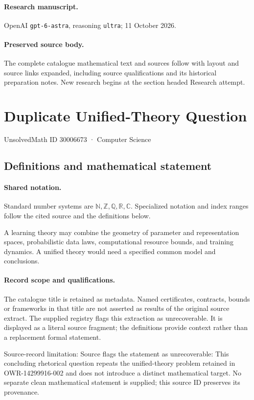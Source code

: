 \documentclass[11pt]{article}
\begin{document}
\paragraph{Research manuscript.} OpenAI \texttt{gpt-6-astra}, reasoning \texttt{ultra}; 11 October 2026.
\paragraph{Preserved source body.} The complete catalogue mathematical text and sources follow with layout and source links expanded, including source qualifications and its historical preparation notes. New research begins at the section headed Research attempt.

\section{Duplicate Unified-Theory Question}\label{30006673}
{\small UnsolvedMath ID 30006673 · Computer Science}
\subsection{Definitions and mathematical statement}

\paragraph{Shared notation.}Standard number systems are $\mathbb N,\mathbb Z,\mathbb Q,\mathbb R,\mathbb C$. Specialized notation and index ranges follow the cited source and the definitions below.


A learning theory may combine the geometry of parameter and representation spaces, probabilistic data laws, computational resource bounds, and training dynamics. A unified theory would need a specified common model and conclusions.
\paragraph{Record scope and qualifications.}
The catalogue title is retained as metadata. Named certificates, contracts, bounds or frameworks in that title are not asserted as results of the original source extract.
The supplied registry flags this extraction as unrecoverable. It is displayed as a literal source fragment; the definitions provide context rather than a replacement formal statement.

Source-record limitation: Source flags the statement as unrecoverable: This concluding rhetorical question repeats the unified-theory problem retained in OWR-14299916-002 and does not introduce a distinct mathematical target. No separate clean mathematical statement is supplied; this source ID preserves its provenance.
\end{document}

